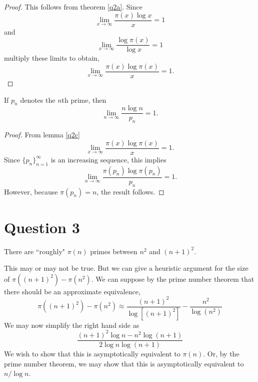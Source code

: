 \documentclass{unswmaths}
\begin{document}
    \begin{proof}
        This follows from theorem \ref{q2a}. Since
        \begin{equation*}
            \lim_{x\rightarrow\infty} \frac{\pi(x)\log{x}}{x} = 1
        \end{equation*}
        and
        \begin{equation*}
            \lim_{x\rightarrow\infty} \frac{\log{\pi(x)}}{\log{x}} = 1
        \end{equation*}
        multiply these limits to obtain,
        \begin{equation*}
            \lim_{x\rightarrow\infty} \frac{\pi(x)\log{\pi(x)}}{x} = 1.
        \end{equation*}
    \end{proof}
    \begin{theorem}
        If $p_n$ denotes the $n$th prime, then
        \begin{equation*}   
            \lim_{n\rightarrow\infty} \frac{n\log{n}}{p_n} = 1.
        \end{equation*}
    \end{theorem}
    \begin{proof}
        From lemma \ref{q2c} 
        \begin{equation*}
            \lim_{x\rightarrow\infty} \frac{\pi(x)\log{\pi(x)}}{x} = 1.
        \end{equation*}
        Since $\{p_n\}_{n=1}^\infty$ is an increasing sequence, this implies
        \begin{equation*}
            \lim_{n\rightarrow\infty} \frac{\pi(p_n)\log{\pi(p_n)}}{p_n} = 1.
        \end{equation*}
        However, because $\pi(p_n) = n$, the result follows.
    \end{proof}
\section*{Question 3}
    \begin{remark}
        There are ``roughly" $\pi(n)$ primes between $n^2$ and $(n+1)^2$.
    \end{remark}
    This may or may not be true. But we can give a heuristic argument for the size of $\pi((n+1)^2)-\pi(n^2)$.
    We can suppose by the prime number theorem that there should be an approximate equivalence,
    \begin{equation*}
        \pi((n+1)^2)-\pi(n^2) \approx \frac{(n+1)^2}{\log{[(n+1)^2]}}-\frac{n^2}{\log{(n^2)}}
    \end{equation*}
    We may now simplify the right hand side as
    \begin{equation*}
        \frac{(n+1)^2\log{n}-n^2\log(n+1)}{2\log{n}\log(n+1)}
    \end{equation*}
    We wish to show that this is asymptotically equivalent to $\pi(n)$. Or, by the prime
    number theorem, we may show that this is asymptotically equivalent to $n/\log{n}$.    
    
\end{document}
